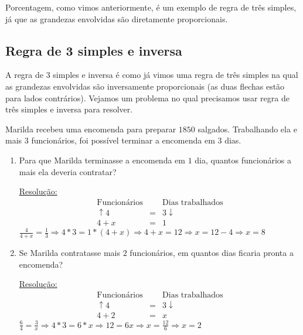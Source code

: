 \begin{obs}
 Porcentagem, como vimos anteriormente, é um exemplo de regra de três simples, já que as grandezas envolvidas são diretamente proporcionais.
\end{obs}


\subsection{Regra de 3 simples e inversa}

A regra de 3 simples e inversa é como já vimos uma regra de três simples na qual as grandezas envolvidas são inversamente proporcionais (as duas flechas estão para lados contrários). Vejamos um problema no qual precisamos usar regra de três simples e inversa para resolver.

\begin{exem}
  Marilda recebeu uma encomenda para preparar $1850$ salgados. Trabalhando ela e mais $3$ funcionários, foi possível terminar a encomenda em $3$ dias.
  \begin{enumerate}
  \item Para que Marilda terminasse a encomenda em $1$ dia, quantos funcionários a mais ela deveria contratar?

  \underline{Resolução:}
  \begin{eqnarray*}
   \text{Funcionários} & & \text{Dias trabalhados} \\
   \uparrow 4 & = & 3 \downarrow \\
   4 + x & = & 1
  \end{eqnarray*}
  $\frac{4}{4+x}= \frac{1}{3} \Rightarrow 4*3=1*(4 + x) \Rightarrow 4 + x = 12 \Rightarrow x = 12 - 4 \Rightarrow x= 8$
  \fim

  \item Se Marilda contratasse mais $2$ funcionários, em quantos dias ficaria pronta a encomenda?

  \underline{Resolução:}
  \begin{eqnarray*}
   \text{Funcionários} & & \text{Dias trabalhados} \\
   \uparrow 4 & = & 3 \downarrow \\
   4 + 2 & = & x
  \end{eqnarray*}
  $\frac{6}{4}= \frac{3}{x} \Rightarrow 4*3=6*x \Rightarrow 12 = 6x \Rightarrow x=\frac{12}{6} \Rightarrow x = 2$
  \fim

  \end{enumerate}
\end{exem}

